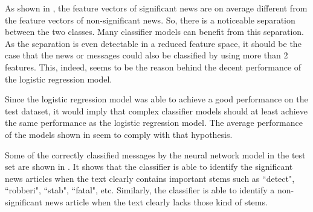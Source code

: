 As shown in , the feature vectors of significant news are on average different from the feature vectors of non-significant news. So, there is a noticeable separation between the two classes. Many classifier models can benefit from this separation. As the separation is even detectable in a reduced feature space, it should be the case that the news or messages could also be classified by using more than 2 features.  This, indeed, seems to be the reason behind the decent performance of the logistic regression model.

Since the logistic regression model was able to achieve a good performance on the test dataset, it would imply that complex classifier models should at least achieve the same performance as the logistic regression model. %
The average performance of the models shown in  seem to comply with that hypothesis.

Some of the correctly classified messages by the neural network model in the test set are shown in . It shows that the classifier is able to identify the significant news articles when the text clearly contains important stems such as ``detect", ``robberi", ``stab", ``fatal", etc. Similarly, the classifier is able to identify a non-significant news article when the text clearly lacks those kind of stems.


